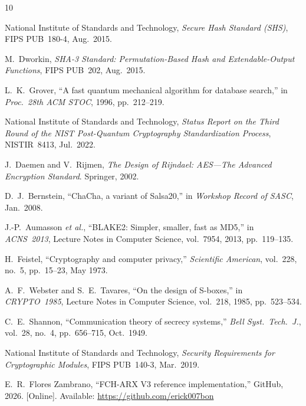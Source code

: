 \documentclass[12pt,journal]{IEEEtran}
\begin{document}
\begin{thebibliography}{10}

  National Institute of Standards and Technology,
  \textit{Secure Hash Standard (SHS)}, FIPS PUB~180-4, Aug.\ 2015.

  M.\ Dworkin,
  \textit{SHA-3 Standard: Permutation-Based Hash and Extendable-Output
  Functions}, FIPS PUB~202, Aug.\ 2015.

  L.\ K.\ Grover,
  ``A fast quantum mechanical algorithm for database search,''
  in \textit{Proc.\ 28th ACM STOC}, 1996, pp.~212--219.

  National Institute of Standards and Technology,
  \textit{Status Report on the Third Round of the NIST Post-Quantum
  Cryptography Standardization Process}, NISTIR~8413, Jul.\ 2022.

  J.\ Daemen and V.\ Rijmen,
  \textit{The Design of Rijndael: AES---The Advanced Encryption Standard}.
  Springer, 2002.

  D.\ J.\ Bernstein,
  ``ChaCha, a variant of Salsa20,''
  in \textit{Workshop Record of SASC}, Jan.\ 2008.

  J.-P.\ Aumasson \textit{et al.},
  ``BLAKE2: Simpler, smaller, fast as MD5,''
  in \textit{ACNS~2013}, Lecture Notes in Computer Science, vol.~7954,
  2013, pp.~119--135.

  H.\ Feistel,
  ``Cryptography and computer privacy,''
  \textit{Scientific American}, vol.~228, no.~5, pp.~15--23, May 1973.

  A.\ F.\ Webster and S.\ E.\ Tavares,
  ``On the design of S-boxes,''
  in \textit{CRYPTO~1985}, Lecture Notes in Computer Science, vol.~218,
  1985, pp.~523--534.

  C.\ E.\ Shannon,
  ``Communication theory of secrecy systems,''
  \textit{Bell Syst.\ Tech.\ J.}, vol.~28, no.~4, pp.~656--715, Oct.\ 1949.

  National Institute of Standards and Technology,
  \textit{Security Requirements for Cryptographic Modules}, FIPS PUB~140-3,
  Mar.\ 2019.

  E.\ R.\ Flores Zambrano,
  ``FCH-ARX V3 reference implementation,''
  GitHub, 2026. [Online]. Available:
  \url{https://github.com/erick007bon}

\end{thebibliography}
\end{document}
